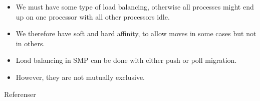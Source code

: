 \documentclass{beamer}
\begin{document}
\begin{frame}{\insertsubsectionhead}
  \begin{itemize}
    \item We must have some type of load balancing, otherwise all processes 
      might end up on one processor with all other processors idle.

    \item We therefore have soft and hard affinity, to allow moves in some 
      cases but not in others.

    \item Load balancing in SMP can be done with either push or poll migration.

    \item However, they are not mutually exclusive.

  \end{itemize}
\end{frame}




\begin{frame}[allowframebreaks]{Referenser}
  \small
  \printbibliography
\end{frame}
\end{document}
